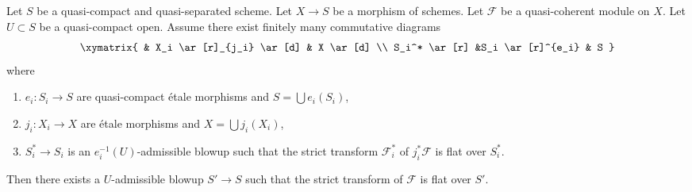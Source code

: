 \begin{lemma}
\label{lemma-flatten-module-etale-localize}
Let $S$ be a quasi-compact and quasi-separated scheme.
Let $X \to S$ be a morphism of schemes.
Let $\mathcal{F}$ be a quasi-coherent module on $X$.
Let $U \subset S$ be a quasi-compact open.
Assume there exist finitely many commutative diagrams
$$
\xymatrix{
& X_i \ar[r]_{j_i} \ar[d] & X \ar[d] \\
S_i^* \ar[r] &S_i \ar[r]^{e_i} & S
}
$$
where
\begin{enumerate}
\item $e_i : S_i \to S$ are quasi-compact \'etale morphisms and
$S = \bigcup e_i(S_i)$,
\item $j_i : X_i \to X$ are \'etale morphisms and
$X = \bigcup j_i(X_i)$,
\item $S^*_i \to S_i$ is an $e_i^{-1}(U)$-admissible blowup
such that the strict transform $\mathcal{F}_i^*$ of $j_i^*\mathcal{F}$
is flat over $S^*_i$.
\end{enumerate}
Then there exists a $U$-admissible blowup $S' \to S$ such that
the strict transform of $\mathcal{F}$ is flat over $S'$.
\end{lemma}

